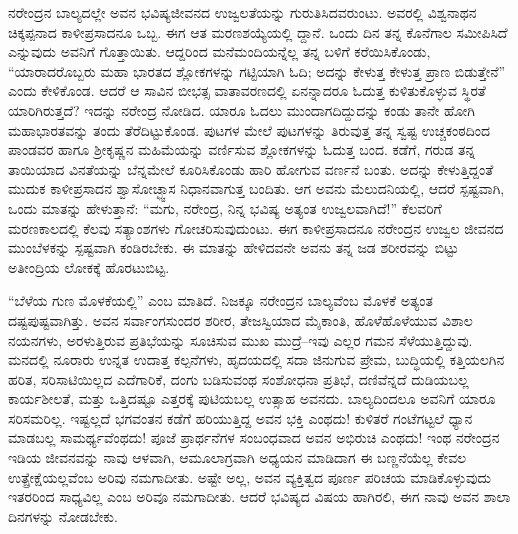 ನರೇಂದ್ರನ ಬಾಲ್ಯದಲ್ಲೇ ಅವನ ಭವಿಷ್ಯಜೀವನದ ಉಜ್ವಲತೆಯನ್ನು ಗುರುತಿಸಿದವರುಂಟು. ಅವರಲ್ಲಿ ವಿಶ್ವನಾಥನ ಚಿಕ್ಕಪ್ಪನಾದ ಕಾಳೀಪ್ರಸಾದನೂ ಒಬ್ಬ. ಈಗ ಆತ ಮರಣಶಯ್ಯೆಯಲ್ಲಿ ದ್ದಾನೆ. ಒಂದು ದಿನ ತನ್ನ ಕೊನೆಗಾಲ ಸಮೀಪಿಸಿದೆ ಎನ್ನುವುದು ಅವನಿಗೆ ಗೊತ್ತಾಯಿತು. ಆದ್ದರಿಂದ ಮನೆಮಂದಿಯನ್ನೆಲ್ಲ ತನ್ನ ಬಳಿಗೆ ಕರೆಯಿಸಿಕೊಂಡು, “ಯಾರಾದರೊಬ್ಬರು ಮಹಾ ಭಾರತದ ಶ್ಲೋಕಗಳನ್ನು ಗಟ್ಟಿಯಾಗಿ ಓದಿ; ಅದನ್ನು ಕೇಳುತ್ತ ಕೇಳುತ್ತ ಪ್ರಾಣ ಬಿಡುತ್ತೇನೆ” ಎಂದು ಕೇಳಿಕೊಂಡ. ಆದರೆ ಆ ಸಾವಿನ ಬೀಭತ್ಸ ವಾತಾವರಣದಲ್ಲಿ ಏನನ್ನಾದರೂ ಓದುತ್ತ ಕುಳಿತುಕೊಳ್ಳುವ ಸ್ಥಿರತೆ ಯಾರಿಗಿರುತ್ತದೆ? ಇದನ್ನು ನರೇಂದ್ರ ನೋಡಿದ. ಯಾರೂ ಓದಲು ಮುಂದಾಗದಿದ್ದುದನ್ನು ಕಂಡು ತಾನೇ ಹೋಗಿ ಮಹಾಭಾರತವನ್ನು ತಂದು ತೆರೆದಿಟ್ಟುಕೊಂಡ. ಪುಟಗಳ ಮೇಲೆ ಪುಟಗಳನ್ನು ತಿರುವುತ್ತ ತನ್ನ ಸ್ವಷ್ಟ ಉಚ್ಚಕಂಠದಿಂದ ಪಾಂಡವರ ಹಾಗೂ ಶ್ರೀಕೃಷ್ಣನ ಮಹಿಮೆಯನ್ನು ವರ್ಣಿಸುವ ಶ್ಲೋಕಗಳನ್ನು ಓದುತ್ತ ಬಂದ. ಕಡೆಗೆ, ಗರುಡ ತನ್ನ ತಾಯಿಯಾದ ವಿನತೆಯನ್ನು ಬೆನ್ನಮೇಲೆ ಕೂರಿಸಿಕೊಂಡು ಹಾರಿ ಹೋಗುವ ವರ್ಣನೆ ಬಂತು. ಅದನ್ನು ಕೇಳುತ್ತಿದ್ದಂತೆ ಮುದುಕ ಕಾಳೀಪ್ರಸಾದನ ಶ್ವಾಸೋಚ್ಛ್ವಾಸ ನಿಧಾನವಾಗುತ್ತ ಬಂದಿತು. ಆಗ ಅವನು ಮೆಲುದನಿಯಲ್ಲಿ, ಆದರೆ ಸ್ಪಷ್ಟವಾಗಿ, ಒಂದು ಮಾತನ್ನು ಹೇಳುತ್ತಾನೆ: “ಮಗು, ನರೇಂದ್ರ, ನಿನ್ನ ಭವಿಷ್ಯ ಅತ್ಯಂತ ಉಜ್ವಲವಾಗಿದೆ!” ಕೆಲವರಿಗೆ ಮರಣಕಾಲದಲ್ಲಿ ಕೆಲವು ಸತ್ಯಾಂಶಗಳು ಗೋಚರಿಸುವುದುಂಟು. ಈಗ ಕಾಳೀಪ್ರಸಾದನೂ ನರೇಂದ್ರನ ಉಜ್ವಲ ಜೀವನದ ಮುಂಬೆಳಕನ್ನು ಸ್ಪಷ್ಟವಾಗಿ ಕಂಡಿರಬೇಕು. ಈ ಮಾತನ್ನು ಹೇಳಿದವನೇ ಅವನು ತನ್ನ ಜಡ ಶರೀರವನ್ನು ಬಿಟ್ಟು ಅತೀಂದ್ರಿಯ ಲೋಕಕ್ಕೆ ಹೊರಟುಬಿಟ್ಟ.

“ಬೆಳೆಯ ಗುಣ ಮೊಳಕೆಯಲ್ಲಿ” ಎಂಬ ಮಾತಿದೆ. ನಿಜಕ್ಕೂ ನರೇಂದ್ರನ ಬಾಲ್ಯವೆಂಬ ಮೊಳಕೆ ಅತ್ಯಂತ ದಷ್ಟಪುಷ್ಟವಾಗಿತ್ತು. ಅವನ ಸರ್ವಾಂಗಸುಂದರ ಶರೀರ, ತೇಜಸ್ವಿಯಾದ ಮೈಕಾಂತಿ, ಹೊಳೆಹೊಳೆಯುವ ವಿಶಾಲ ನಯನಗಳು, ಅರಳುತ್ತಿರುವ ಪ್ರತಿಭೆಯನ್ನು ಸೂಚಿಸುವ ಮುಖ ಮುದ್ರೆ–ಇವು ಎಲ್ಲರ ಗಮನ ಸೆಳೆಯುತ್ತಿದ್ದುವು. ಮನದಲ್ಲಿ ನೂರಾರು ಉನ್ನತ ಉದಾತ್ತ ಕಲ್ಪನೆಗಳು, ಹೃದಯದಲ್ಲಿ ಸದಾ ಜಿನುಗುವ ಪ್ರೇಮ, ಬುದ್ಧಿಯಲ್ಲಿ ಕತ್ತಿಯಲಗಿನ ಹರಿತ, ಸರಿಸಾಟಿಯಿಲ್ಲದ ಎದೆಗಾರಿಕೆ, ದಂಗು ಬಡಿಸುವಂಥ ಸಂಶೋಧನಾ ಪ್ರತಿಭೆ, ದಣಿವೆನ್ನದೆ ದುಡಿಯಬಲ್ಲ ಕಾರ್ಯಶೀಲತೆ, ಮತ್ತು ಒತ್ತಿದಷ್ಟೂ ಎತ್ತರಕ್ಕೆ ಪುಟಿಯಬಲ್ಲ ಉತ್ಸಾಹ ಅವನದು. ಬಾಲ್ಯದಿಂದಲೂ ಅವನಿಗೆ ಯಾರೂ ಸರಿಸಮರಿಲ್ಲ. ಇಷ್ಟಲ್ಲದೆ ಭಗವಂತನ ಕಡೆಗೆ ಹರಿಯುತ್ತಿದ್ದ ಅವನ ಭಕ್ತಿ ಎಂಥದು! ಕುಳಿತರೆ ಗಂಟೆಗಟ್ಟಲೆ ಧ್ಯಾನ ಮಾಡಬಲ್ಲ ಸಾಮರ್ಥ್ಯವೆಂಥದು! ಪೂಜೆ ಪ್ರಾರ್ಥನೆಗಳ ಸಂಬಂಧವಾದ ಅವನ ಅಭಿರುಚಿ ಎಂಥದು! ಇಂಥ ನರೇಂದ್ರನ ಇಡಿಯ ಜೀವನವನ್ನು ನಾವು ಆಳವಾಗಿ, ಆಮೂಲಾಗ್ರವಾಗಿ ಅಧ್ಯಯನ ಮಾಡಿದಾಗ ಈ ಬಣ್ಣನೆಯೆಲ್ಲ ಕೇವಲ ಉತ್ಪ್ರೇಕ್ಷೆಯಲ್ಲವೆಂಬ ಅರಿವು ನಮಗಾದೀತು. ಅಷ್ಟೇ ಅಲ್ಲ, ಅವನ ವ್ಯಕ್ತಿತ್ವದ ಪೂರ್ಣ ಪರಿಚಯ ಮಾಡಿಕೊಳ್ಳುವುದು ಇತರರಿಂದ ಸಾಧ್ಯವಿಲ್ಲ ಎಂಬ ಅರಿವೂ ನಮಗಾದೀತು. ಆದರೆ ಭವಿಷ್ಯದ ವಿಷಯ ಹಾಗಿರಲಿ, ಈಗ ನಾವು ಅವನ ಶಾಲಾ ದಿನಗಳನ್ನು ನೋಡಬೇಕು. 

